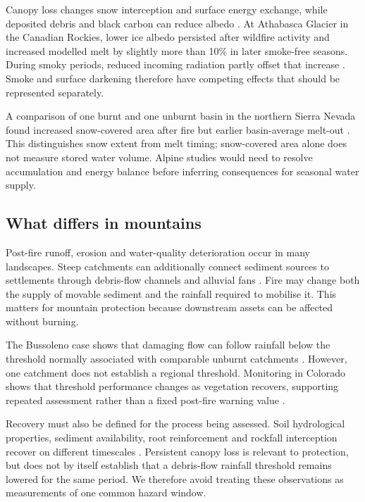 \documentclass[11pt,a4paper]{article}
\begin{document}
Canopy loss changes snow interception and surface energy exchange, while deposited debris and black carbon can reduce albedo \citep{koshkin_wildfire_2022}. At Athabasca Glacier in the Canadian Rockies, lower ice albedo persisted after wildfire activity and increased modelled melt by slightly more than 10\% in later smoke-free seasons. During smoky periods, reduced incoming radiation partly offset that increase \citep{aubrywake_fire_2022}. Smoke and surface darkening therefore have competing effects that should be represented separately.

A comparison of one burnt and one unburnt basin in the northern Sierra Nevada found increased snow-covered area after fire but earlier basin-average melt-out \citep{micheletty_application_2014}. This distinguishes snow extent from melt timing; snow-covered area alone does not measure stored water volume. Alpine studies would need to resolve accumulation and energy balance before inferring consequences for seasonal water supply.

\subsection{What differs in mountains}

Post-fire runoff, erosion and water-quality deterioration occur in many landscapes. Steep catchments can additionally connect sediment sources to settlements through debris-flow channels and alluvial fans \citep{santi_wildfire_2022, tiranti_wildfires_2021}. Fire may change both the supply of movable sediment and the rainfall required to mobilise it. This matters for mountain protection because downstream assets can be affected without burning.

The Bussoleno case shows that damaging flow can follow rainfall below the threshold normally associated with comparable unburnt catchments \citep{laporta_postwildfire_2025}. However, one catchment does not establish a regional threshold. Monitoring in Colorado shows that threshold performance changes as vegetation recovers, supporting repeated assessment rather than a fixed post-fire warning value \citep{rengers_evaluating_2024}.

Recovery must also be defined for the process being assessed. Soil hydrological properties, sediment availability, root reinforcement and rockfall interception recover on different timescales \citep{negri_wildfire_2026, gehring_shallow_2019, maringer_temporal_2016}. Persistent canopy loss is relevant to protection, but does not by itself establish that a debris-flow rainfall threshold remains lowered for the same period. We therefore avoid treating these observations as measurements of one common hazard window.
\end{document}
